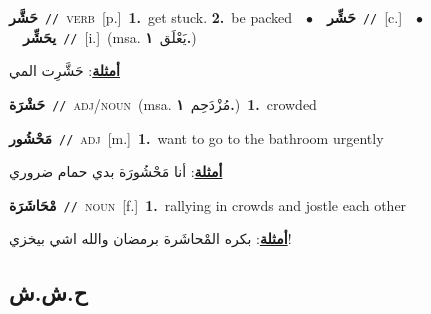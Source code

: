\documentclass[10pt,a4paper,twoside]{article} %
\begin{document}
\begin{multicols}{2}
{\setlength\topsep{0pt}\textbf{\foreignlanguage{arabic}{حَشَّر}}\ {\color{gray}\texttt{//}\color{black}}\ \textsc{verb}\ [p.]\ \textbf{1.}~get stuck.  \textbf{2.}~be packed\ \ $\bullet$\ \ \setlength\topsep{0pt}\textbf{\foreignlanguage{arabic}{حَشِّر}}\ {\color{gray}\texttt{//}\color{black}}\ [c.]\ \ $\bullet$\ \ \setlength\topsep{0pt}\textbf{\foreignlanguage{arabic}{يحَشِّر}}\ {\color{gray}\texttt{//}\color{black}}\ [i.]\ \color{gray}(msa. \foreignlanguage{arabic}{يَعْلَق}~\foreignlanguage{arabic}{\textbf{١.}})\color{black}\  \begin{flushright}\color{gray}\foreignlanguage{arabic}{\textbf{\underline{\foreignlanguage{arabic}{أمثلة}}}: حَشَّرِت المي}\end{flushright}\color{black}} \vspace{2mm}

{\setlength\topsep{0pt}\textbf{\foreignlanguage{arabic}{حَشْرَة}}\ {\color{gray}\texttt{//}\color{black}}\ \textsc{adj/noun}\ \color{gray}(msa. \foreignlanguage{arabic}{مُزْدَحِم}~\foreignlanguage{arabic}{\textbf{١.}})\color{black}\ \textbf{1.}~crowded\ } \vspace{2mm}

{\setlength\topsep{0pt}\textbf{\foreignlanguage{arabic}{مَحْشُور}}\ {\color{gray}\texttt{//}\color{black}}\ \textsc{adj}\ [m.]\ \textbf{1.}~want to go to the bathroom urgently\  \begin{flushright}\color{gray}\foreignlanguage{arabic}{\textbf{\underline{\foreignlanguage{arabic}{أمثلة}}}: أنا مَحْشُورَة بدي حمام ضروري}\end{flushright}\color{black}} \vspace{2mm}

{\setlength\topsep{0pt}\textbf{\foreignlanguage{arabic}{مْحَاشَرَة}}\ {\color{gray}\texttt{//}\color{black}}\ \textsc{noun}\ [f.]\ \textbf{1.}~rallying in crowds and jostle each other\  \begin{flushright}\color{gray}\foreignlanguage{arabic}{\textbf{\underline{\foreignlanguage{arabic}{أمثلة}}}: بكره المْحاشَرة برمضان والله اشي بيخزي!}\end{flushright}\color{black}} \vspace{2mm}

\vspace{-3mm}
\subsection*{\color{blue}\foreignlanguage{arabic}{ح.ش.ش}\color{blue}{}} 


\end{multicols}
\end{document}
